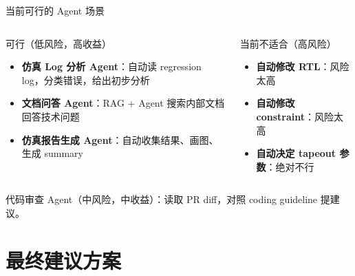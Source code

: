 \documentclass[UTF8,11pt,aspectratio=169]{beamer}
\begin{document}
\begin{frame}{当前可行的 Agent 场景}
  \begin{columns}[T]
    \begin{block}{可行（低风险，高收益）}
      \begin{itemize}
        \item \textbf{仿真 Log 分析 Agent}：自动读 regression log，分类错误，给出初步分析
        \item \textbf{文档问答 Agent}：RAG + Agent 搜索内部文档回答技术问题
        \item \textbf{仿真报告生成 Agent}：自动收集结果、画图、生成 summary
      \end{itemize}
    \end{block}

    \begin{alertblock}{当前不适合（高风险）}
      \begin{itemize}
        \item \textbf{自动修改 RTL}：风险太高
        \item \textbf{自动修改 constraint}：风险太高
        \item \textbf{自动决定 tapeout 参数}：绝对不行
      \end{itemize}
    \end{alertblock}
  \end{columns}

  \vspace{0.5em}
  代码审查 Agent（中风险，中收益）：读取 PR diff，对照 coding guideline 提建议。
\end{frame}

\section{最终建议方案}
\end{document}
